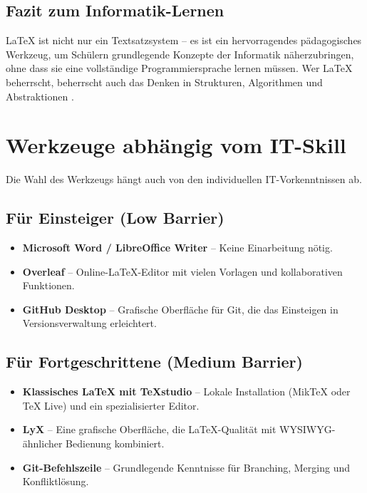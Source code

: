 \documentclass[a4paper,12pt]{article}
\begin{document}
		\subsection{Fazit zum Informatik-Lernen}
		LaTeX ist nicht nur ein Textsatzsystem – es ist ein hervorragendes pädagogisches Werkzeug, um Schülern grundlegende Konzepte der Informatik näherzubringen, ohne dass sie eine vollständige Programmiersprache lernen müssen. Wer LaTeX beherrscht, beherrscht auch das Denken in Strukturen, Algorithmen und Abstraktionen \cite{knuth-teaching}.
		
		\section{Werkzeuge abhängig vom IT-Skill}
		\label{sec:tools}
		
		Die Wahl des Werkzeugs hängt auch von den individuellen IT-Vorkenntnissen ab.
		
		\subsection{Für Einsteiger (Low Barrier)}
		\begin{itemize}
			\item \textbf{Microsoft Word / LibreOffice Writer} – Keine Einarbeitung nötig.
			\item \textbf{Overleaf} – Online-\LaTeX-Editor mit vielen Vorlagen und kollaborativen Funktionen.
			\item \textbf{GitHub Desktop} – Grafische Oberfläche für Git, die das Einsteigen in Versionsverwaltung erleichtert.
		\end{itemize}
		
		\subsection{Für Fortgeschrittene (Medium Barrier)}
		\begin{itemize}
			\item \textbf{Klassisches \LaTeX{} mit TeXstudio} – Lokale Installation (MikTeX oder TeX Live) und ein spezialisierter Editor.
			\item \textbf{LyX} – Eine grafische Oberfläche, die \LaTeX{}-Qualität mit WYSIWYG-ähnlicher Bedienung kombiniert.
			\item \textbf{Git-Befehlszeile} – Grundlegende Kenntnisse für Branching, Merging und Konfliktlösung.
		\end{itemize}
		
\end{document}
